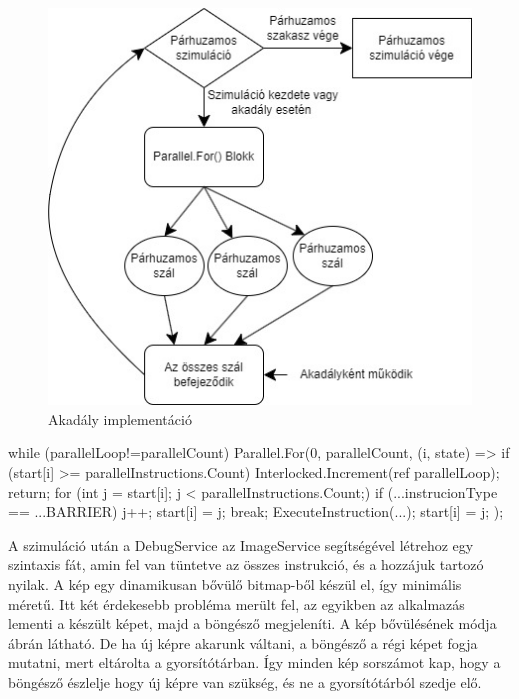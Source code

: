 \begin{figure}[h]
\centering
\includegraphics[scale=0.7]{images/Barrier.jpg}
\caption{Akadály implementáció}
\label{fig:Barrier}
\end{figure}

\begin{cpp}
while (parallelLoop!=parallelCount)
      {
           Parallel.For(0, parallelCount, (i, state) =>
           {
               if (start[i] >= parallelInstructions.Count)
               {
                   Interlocked.Increment(ref parallelLoop);
                   return;
               } 
               for (int j = start[i]; j < parallelInstructions.Count;)
               {
                   if (...instrucionType == ...BARRIER)
                      {
                          j++;
                          start[i] = j;
                          break;
                      }
                   ExecuteInstruction(...);
                   start[i] = j;
                }
            });
      }
\end{cpp}

A szimuláció után a DebugService az ImageService segítségével létrehoz egy szintaxis fát, amin fel van tüntetve az összes instrukció, és a hozzájuk tartozó nyilak. A kép egy dinamikusan bővülő bitmap-ből készül el, így minimális méretű. Itt két érdekesebb probléma merült fel, az egyikben az alkalmazás lementi a készült képet, majd a böngésző megjeleníti. A kép bővülésének módja  ábrán látható. De ha új képre akarunk váltani, a böngésző a régi képet fogja mutatni, mert eltárolta a gyorsítótárban. Így minden kép sorszámot kap, hogy a böngésző észlelje hogy új képre van szükség, és ne a gyorsítótárból szedje elő. 

